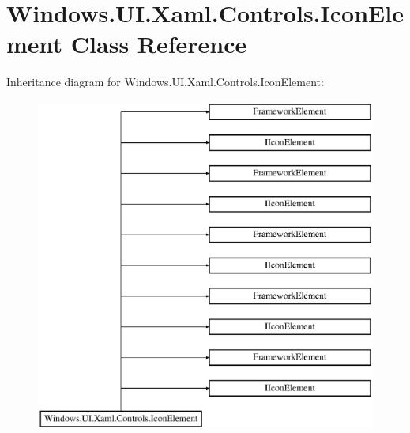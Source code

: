 \hypertarget{class_windows_1_1_u_i_1_1_xaml_1_1_controls_1_1_icon_element}{}\section{Windows.\+U\+I.\+Xaml.\+Controls.\+Icon\+Element Class Reference}
\label{class_windows_1_1_u_i_1_1_xaml_1_1_controls_1_1_icon_element}
Inheritance diagram for Windows.\+U\+I.\+Xaml.\+Controls.\+Icon\+Element\+:\begin{figure}[H]
\begin{center}
\leavevmode
\includegraphics[height=11.000000cm]{class_windows_1_1_u_i_1_1_xaml_1_1_controls_1_1_icon_element}
\end{center}
\end{figure}
